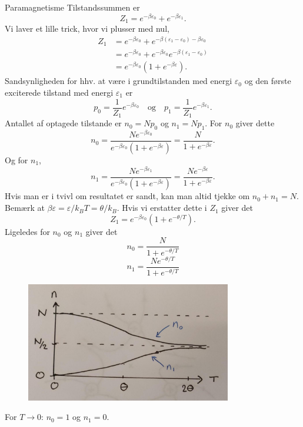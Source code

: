 \begin{opgave}{Paramagnetisme}
    \opg Tilstandssummen er
    \[ Z_1=e^{-\beta\varepsilon_0}+e^{-\beta\varepsilon_1}. \]
    \opg Vi laver et lille trick, hvor vi plusser med nul,
    \begin{align*}
        Z_1&=e^{-\beta\varepsilon_0}+e^{-\beta(\varepsilon_1-\varepsilon_0)-\beta\varepsilon_0}\\
        &=e^{-\beta\varepsilon_0}+e^{-\beta\varepsilon_0}e^{-\beta(\varepsilon_1-\varepsilon_0)}\\
        &=e^{-\beta\varepsilon_0}\left(1+e^{-\beta\varepsilon}\right).
    \end{align*}
    \opg Sandsynligheden for hhv. at være i grundtilstanden med energi $\varepsilon_0$ og den første exciterede tilstand med energi $\varepsilon_1$ er
    \[ p_0=\frac{1}{Z_1}e^{-\beta\varepsilon_0}\quad\text{og}\quad p_1=\frac{1}{Z_1}e^{-\beta\varepsilon_1}. \]
    Antallet af optagede tilstande er $n_0=Np_0$ og $n_1=Np_1$. For $n_0$ giver dette
    \[ n_0=\frac{Ne^{-\beta\varepsilon_0}}{e^{-\beta\varepsilon_0}\left(1+e^{-\beta\varepsilon}\right)}=\frac{N}{1+e^{-\beta\varepsilon}}. \]
    Og for $n_1$,
    \[ n_1=\frac{Ne^{-\beta\varepsilon_1}}{e^{-\beta\varepsilon_0}\left(1+e^{-\beta\varepsilon}\right)}=\frac{Ne^{-\beta\varepsilon}}{1+e^{-\beta\varepsilon}}. \]
    Hvis man er i tvivl om resultatet er sandt, kan man altid tjekke om $n_0+n_1=N$.
    \opg Bemærk at $\beta\varepsilon=\varepsilon/k_BT=\theta/k_B$. Hvis vi erstatter dette i $Z_1$ giver det
    \[ Z_1=e^{-\beta\varepsilon_0}\left(1+e^{-\theta/T}\right). \]
    Ligeledes for $n_0$ og $n_1$ giver det
    \[ n_0=\frac{N}{1+e^{-\theta/T}} \]
    \[ n_1=\frac{Ne^{-\theta/T}}{1+e^{-\theta/T}} \]
    \opg 
    \begin{figure}[H]
        \centering
        \includegraphics[width=0.8\textwidth]{facit/figurer/statfys/statfys_opg7,5.jpg}
    \end{figure}
    For $T\to 0$: $n_0=1$ og $n_1=0$.\\

\end{opgave}
